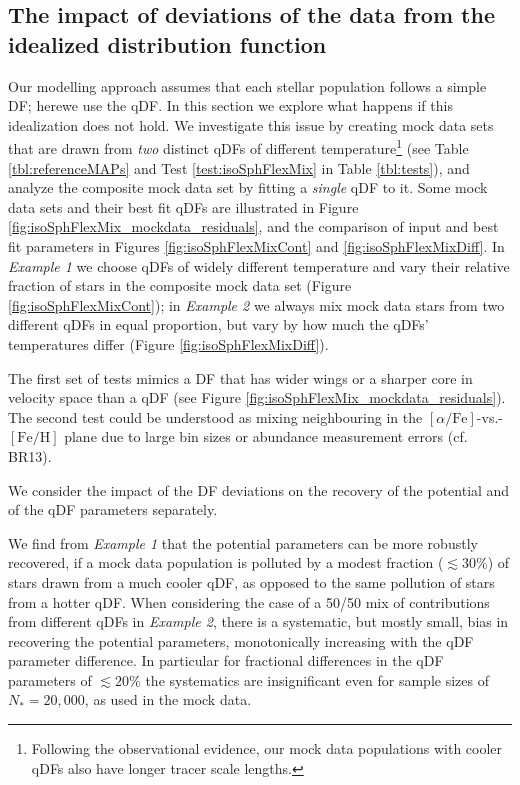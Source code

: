 
\subsection{The impact of deviations of the data from the idealized distribution function} \label{sec:results_mixedDFs}

Our modelling approach assumes that each stellar population follows a simple DF; herewe use the qDF. In this section we explore what happens if this idealization does not hold. We investigate this issue by creating mock data sets that are drawn from \emph{two} distinct qDFs of different temperature\footnote{Following the observational evidence, our mock data populations with cooler qDFs also have longer tracer scale lengths.} (see Table \ref{tbl:referenceMAPs} and Test \ref{test:isoSphFlexMix} in Table \ref{tbl:tests}), and analyze the composite mock data set by fitting a \emph{single} qDF to it. Some mock data sets and their best fit qDFs are illustrated in Figure \ref{fig:isoSphFlexMix_mockdata_residuals}, and the comparison of input and best fit parameters in Figures \ref{fig:isoSphFlexMixCont} and \ref{fig:isoSphFlexMixDiff}. In \emph{Example 1} we choose qDFs of widely different temperature and vary their relative fraction of stars in the composite mock data set (Figure \ref{fig:isoSphFlexMixCont}); in \emph{Example 2} we always mix mock data stars from two different qDFs in equal proportion, but vary by how much the qDFs' temperatures differ (Figure \ref{fig:isoSphFlexMixDiff}). 

The first set of tests mimics a DF that has wider wings or a sharper core in velocity space than a qDF (see Figure \ref{fig:isoSphFlexMix_mockdata_residuals}). The second test could be understood as mixing neighbouring \MAPs{} in the $[\alpha/\mathrm{Fe}]$-vs.-$[\mathrm{Fe}/\mathrm{H}]$ plane due to large bin sizes or abundance measurement errors (cf. BR13). 

We consider the impact of the DF deviations on the recovery of the potential and of the qDF parameters separately. 

We find from \emph{Example 1} that the potential parameters can be more robustly recovered, if a mock data population is polluted by a modest fraction ($\lesssim 30\%$) of stars drawn from a much cooler qDF, as opposed to the same pollution of stars from a hotter qDF. When considering the case of a 50/50 mix of contributions from different qDFs in \emph{Example 2}, there is a systematic, but mostly small, bias in recovering the potential parameters, monotonically increasing with the qDF parameter difference. In particular for fractional differences in the qDF parameters of $\lesssim 20\%$ the systematics are insignificant even for sample sizes of $N_{*} = 20,000$, as used in the mock data.

